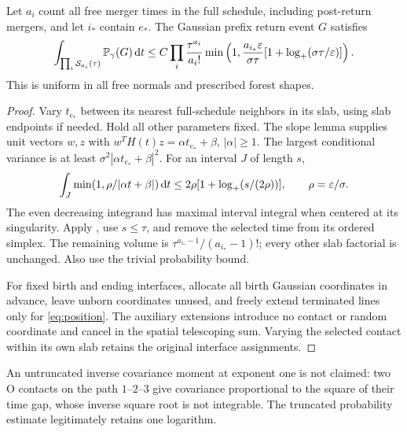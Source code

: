 \begin{proposition}\label{prop:nonneighbor}
Let $a_i$ count all free merger times in the full schedule, including
post-return mergers, and let $i_*$ contain $e_*$. The Gaussian prefix
return event $G$ satisfies
\[
 \int_{\prod_i\mathcal S_{a_i}(\tau)}\mathbb P_\gamma(G)\,\mathrm d t
 \leq C\prod_i\frac{\tau^{a_i}}{a_i!}
 \min\left(1,\frac{a_{i_*}\varepsilon}{\sigma\tau}
                  [1+\log_+(\sigma\tau/\varepsilon)]\right).
\]
This is uniform in all free normals and prescribed forest shapes.
\end{proposition}
\begin{proof}
Vary $t_{e_*}$ between its nearest full-schedule neighbors in its slab,
using slab endpoints if needed. Hold all other parameters fixed.
The slope lemma supplies unit vectors $w,z$ with
$w^TH(t)z=\alpha t_{e_*}+\beta$, $|\alpha|\geq1$.
The largest conditional variance is at least
$\sigma^2|\alpha t_{e_*}+\beta|^2$. For an interval $J$ of length $s$,
\[
 \int_J\min(1,\rho/|\alpha t+\beta|)\,\mathrm d t
       \leq2\rho[1+\log_+(s/(2\rho))],\qquad \rho=\varepsilon/\sigma.
\]
The even decreasing integrand has maximal interval integral when centered
at its singularity. Apply , use $s\leq\tau$, and
remove the selected time from its ordered simplex. The remaining volume
is $\tau^{a_{i_*}-1}/(a_{i_*}-1)!$; every other slab factorial is unchanged.
Also use the trivial probability bound.

For fixed birth and ending interfaces, allocate all birth Gaussian
coordinates in advance, leave unborn coordinates unused, and freely
extend terminated lines only for \eqref{eq:position}. The auxiliary
extensions introduce no contact or random coordinate and cancel in the
spatial telescoping sum. Varying the selected contact within its own slab
retains the original interface assignments.
\end{proof}

An untruncated inverse covariance moment at exponent one is not claimed:
two O contacts on the path $1$--$2$--$3$ give covariance proportional to
the square of their time gap, whose inverse square root is not integrable.
The truncated probability estimate legitimately retains one logarithm.
